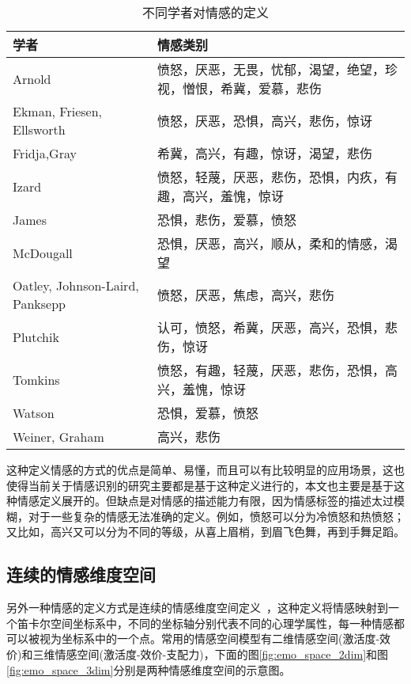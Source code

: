 \begin{table}[htb]
  \centering
  \begin{minipage}[t]{0.8\linewidth} %
  \caption{不同学者对情感的定义}
  \label{tab:emo_categories}
    \begin{tabularx}{\linewidth}{X<{\centering} X<{\centering}}
        \toprule[1.5pt]
        学者 & 情感类别 \\
        \midrule[1pt]
        Arnold & 愤怒，厌恶，无畏，忧郁，渴望，绝望，珍视，憎恨，希冀，爱慕，悲伤 \\
        Ekman, Friesen, Ellsworth & 愤怒，厌恶，恐惧，高兴，悲伤，惊讶 \\
        Fridja,Gray & 希冀，高兴，有趣，惊讶，渴望，悲伤 \\
        Izard & 愤怒，轻蔑，厌恶，悲伤，恐惧，内疚，有趣，高兴，羞愧，惊讶 \\
        James & 恐惧，悲伤，爱慕，愤怒 \\
        McDougall & 恐惧，厌恶，高兴，顺从，柔和的情感，渴望 \\
        Oatley, Johnson-Laird, Panksepp & 愤怒，厌恶，焦虑，高兴，悲伤 \\
        Plutchik & 认可，愤怒，希冀，厌恶，高兴，恐惧，悲伤，惊讶 \\
        Tomkins & 愤怒，有趣，轻蔑，厌恶，悲伤，恐惧，高兴，羞愧，惊讶 \\
        Watson & 恐惧，爱慕，愤怒 \\
        Weiner, Graham & 高兴，悲伤 \\
        \bottomrule[1.5pt]
    \end{tabularx}
  \end{minipage}
\end{table}

这种定义情感的方式的优点是简单、易懂，而且可以有比较明显的应用场景，这也使得当前关于情感识别的研究主要都是基于这种定义进行的，本文也主要是基于这种情感定义展开的。但缺点是对情感的描述能力有限，因为情感标签的描述太过模糊，对于一些复杂的情感无法准确的定义。例如，愤怒可以分为冷愤怒和热愤怒；又比如，高兴又可以分为不同的等级，从喜上眉梢，到眉飞色舞，再到手舞足蹈。

\subsection{连续的情感维度空间}
\label{ssec:continuous_space}
另外一种情感的定义方式是连续的情感维度空间定义~\cite{Cowie2002Emotion}，这种定义将情感映射到一个笛卡尔空间坐标系中，不同的坐标轴分别代表不同的心理学属性，每一种情感都可以被视为坐标系中的一个点。常用的情感空间模型有二维情感空间(激活度-效价)和三维情感空间(激活度-效价-支配力)，下面的图\ref{fig:emo_space_2dim}和图\ref{fig:emo_space_3dim}分别是两种情感维度空间的示意图。

